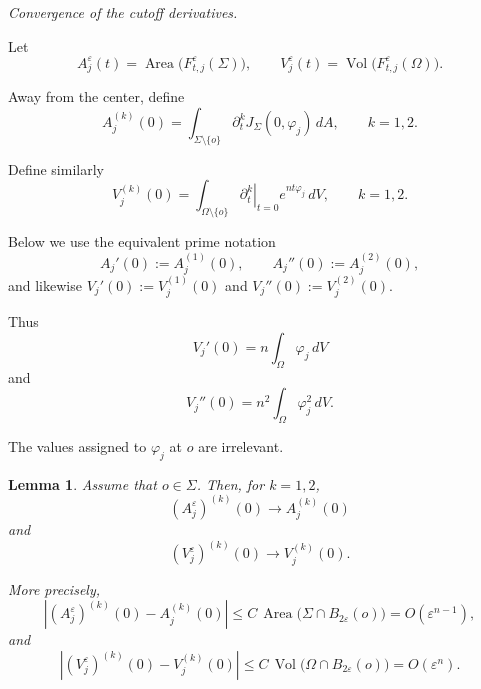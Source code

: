 \documentclass[11pt,reqno]{amsart}
\numberwithin{equation}{section}
\newtheorem{lemma}[theorem]{Lemma}
\theoremstyle{definition}
\theoremstyle{remark}
\newcommand{\Area}{\operatorname{Area}}
\newcommand{\Vol}{\operatorname{Vol}}
\newcommand{\eps}{\varepsilon}
\newcommand{\ithead}[1]{%
  \par\medskip\noindent\textit{#1}\enspace
}
\begin{document}
\ithead{Convergence of the cutoff derivatives.}

Let
\[
A^\eps_j(t)
=
\Area\bigl(F^\eps_{t,j}(\Sigma)\bigr),
\qquad
V^\eps_j(t)
=
\Vol\bigl(F^\eps_{t,j}(\Omega)\bigr).
\]

Away from the center, define
\[
A_j^{(k)}(0)
=
\int_{\Sigma\setminus\{o\}}
\partial_t^kJ_\Sigma(0,\varphi_j)\,dA,
\qquad
k=1,2.
\]

Define similarly
\[
V_j^{(k)}(0)
=
\int_{\Omega\setminus\{o\}}
\left.
\partial_t^k
\right|_{t=0}
e^{nt\varphi_j}\,dV,
\qquad
k=1,2.
\]

Below we use the equivalent prime notation
\[
A_j'(0):=A_j^{(1)}(0),\qquad A_j''(0):=A_j^{(2)}(0),
\]
and likewise \(V_j'(0):=V_j^{(1)}(0)\) and
\(V_j''(0):=V_j^{(2)}(0)\).

Thus
\[
V_j'(0)
=
n\int_\Omega\varphi_j\,dV
\]
and
\[
V_j''(0)
=
n^2\int_\Omega\varphi_j^2\,dV.
\]

The values assigned to \(\varphi_j\) at \(o\) are irrelevant.

\begin{lemma}
\label{lem:cutoff-derivative-convergence}
Assume that \(o\in\Sigma\). Then, for \(k=1,2\),
\[
(A^\eps_j)^{(k)}(0)
\longrightarrow
A_j^{(k)}(0)
\]
and
\[
(V^\eps_j)^{(k)}(0)
\longrightarrow
V_j^{(k)}(0).
\]

More precisely,
\begin{equation}
\left|
(A^\eps_j)^{(k)}(0)-A_j^{(k)}(0)
\right|
\le
C\,
\Area\bigl(\Sigma\cap B_{2\eps}(o)\bigr)
=
O(\eps^{n-1}),
\label{eq:area-error-explicit}
\end{equation}
and
\begin{equation}
\left|
(V^\eps_j)^{(k)}(0)-V_j^{(k)}(0)
\right|
\le
C\,
\Vol\bigl(\Omega\cap B_{2\eps}(o)\bigr)
=
O(\eps^n).
\label{eq:volume-error-explicit}
\end{equation}
\end{lemma}
\end{document}
